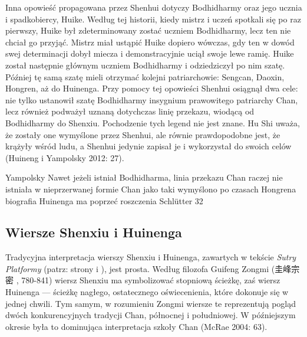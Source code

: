 Inna opowieść propagowana przez Shenhui dotyczy Bodhidharmy oraz jego ucznia i spadkobiercy, Huike. Według tej historii, kiedy mistrz i uczeń spotkali się po raz pierwszy, Huike był zdeterminowany zostać uczniem Bodhidharmy, lecz ten nie chciał go przyjąć. Mistrz miał ustąpić Huike dopiero wówczas, gdy ten w dowód swej determinacji dobył miecza i demonstracyjnie uciął swoje lewe ramię. Huike został następnie głównym uczniem Bodhidharmy i odziedziczył po nim szatę. Później tę samą szatę mieli otrzymać kolejni patriarchowie: Sengcan, Daoxin, Hongren, aż do Huinenga. Przy pomocy tej opowieści Shenhui osiągnął dwa cele: nie tylko ustanowił szatę Bodhidharmy insygnium prawowitego patriarchy Chan, lecz również podważył uznaną dotychczas linię przekazu, wiodącą od Bodhidharmy do Shenxiu. Pochodzenie tych legend nie jest znane. Hu Shi uważa, że zostały one wymyślone przez Shenhui, ale równie prawdopodobne jest, że krążyły wśród ludu, a Shenhui jedynie zapisał je i wykorzystał do swoich celów (Huineng i Yampolsky 2012: 27).

Yampolsky
Nawet jeżeli istniał Bodhidharma, linia przekazu Chan raczej nie istniała w nieprzerwanej formie
Chan jako taki wymyślono po czasach Hongrena
biografia Huinenga ma poprzeć roszczenia
Schlütter 32
\fi

\subsection{Wiersze Shenxiu i Huinenga}
Tradycyjna interpretacja wierszy Shenxiu i Huinenga, zawartych w tekście \textit{Sutry Platformy} (patrz: strony \pageref{ShenxiuVerse} i \pageref{HuinengVerse}), jest prosta.
Według filozofa Guifeng Zongmi (圭峰宗密 , 780-841) wiersz Shenxiu ma symbolizować stopniową ścieżkę, zaś wiersz Huinenga --- ścieżkę nagłego, ostatecznego oświecenienia, które dokonuje się w jednej chwili.
Tym samym, w rozumieniu Zongmi wiersze te reprezentują pogląd dwóch konkurencyjnych tradycji Chan, północnej i południowej.
W późniejszym okresie była to dominująca interpretacja szkoły Chan
(McRae 2004: 63).

